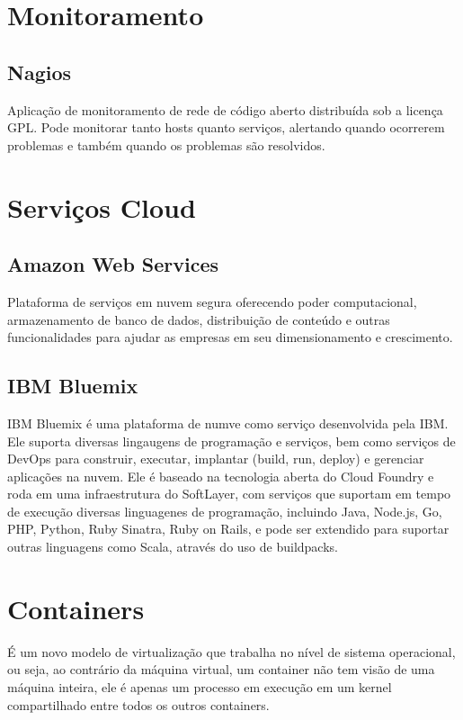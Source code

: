     \section{Monitoramento}

	\subsection{Nagios} Aplicação de monitoramento de rede de código
	aberto distribuída sob a licença GPL. Pode monitorar tanto hosts
	quanto serviços, alertando quando ocorrerem problemas e também
	quando os problemas são resolvidos.

\section{Serviços Cloud}

  	\subsection{Amazon Web Services} Plataforma de serviços em nuvem
  	segura oferecendo poder computacional, armazenamento de banco de
  	dados, distribuição de conteúdo e outras funcionalidades para
  	ajudar as empresas em seu dimensionamento e crescimento.

    \subsection{IBM Bluemix}
    IBM Bluemix é uma plataforma de numve como serviço desenvolvida pela IBM. Ele suporta diversas lingaugens de programação e serviços, bem como serviços de DevOps para construir, executar, implantar (build, run, deploy) e gerenciar aplicações na nuvem. Ele é baseado na tecnologia aberta do Cloud Foundry e roda em uma infraestrutura do SoftLayer, com serviços que suportam em tempo de execução diversas linguagenes de programação, incluindo Java, Node.js, Go, PHP, Python, Ruby Sinatra, Ruby on Rails, e pode ser extendido para suportar outras linguagens como Scala, através do uso de buildpacks.

\section{Containers}
    É um novo modelo de virtualização que trabalha no nível de sistema operacional,
    ou seja, ao contrário da máquina virtual, um container não tem visão de uma
    máquina inteira, ele é apenas um processo em execução em um kernel compartilhado
    entre todos os outros containers.

